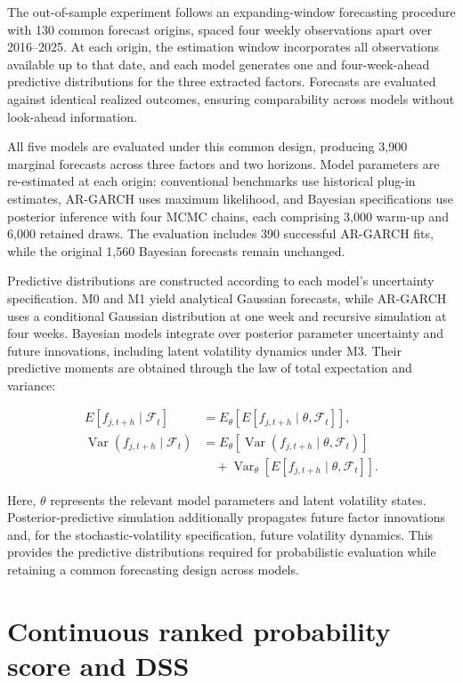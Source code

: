 \documentclass[
  12pt,
  letterpaper,
  DIV=11,
  numbers=noendperiod]{scrreprt}
\begin{document}
The out-of-sample experiment follows an expanding-window forecasting
procedure with 130 common forecast origins, spaced four weekly
observations apart over 2016--2025. At each origin, the estimation
window incorporates all observations available up to that date, and each
model generates one and four-week-ahead predictive distributions for the
three extracted factors. Forecasts are evaluated against identical
realized outcomes, ensuring comparability across models without
look-ahead information.

All five models are evaluated under this common design, producing 3,900
marginal forecasts across three factors and two horizons. Model
parameters are re-estimated at each origin: conventional benchmarks use
historical plug-in estimates, AR-GARCH uses maximum likelihood, and
Bayesian specifications use posterior inference with four MCMC chains,
each comprising 3,000 warm-up and 6,000 retained draws. The evaluation
includes 390 successful AR-GARCH fits, while the original 1,560 Bayesian
forecasts remain unchanged.

Predictive distributions are constructed according to each model's
uncertainty specification. M0 and M1 yield analytical Gaussian
forecasts, while AR-GARCH uses a conditional Gaussian distribution at
one week and recursive simulation at four weeks. Bayesian models
integrate over posterior parameter uncertainty and future innovations,
including latent volatility dynamics under M3. Their predictive moments
are obtained through the law of total expectation and variance:

\[
\begin{aligned}
E[f_{j,t+h}\mid\mathcal F_t]
&=E_\theta\!\left[
E[f_{j,t+h}\mid\theta,\mathcal F_t]
\right],\\
\operatorname{Var}(f_{j,t+h}\mid\mathcal F_t)
&=E_\theta\!\left[
\operatorname{Var}(f_{j,t+h}\mid\theta,\mathcal F_t)
\right]\\
&\quad+\operatorname{Var}_\theta\!\left[
E[f_{j,t+h}\mid\theta,\mathcal F_t]
\right].
\end{aligned}
\]

Here, \(\theta\) represents the relevant model parameters and latent
volatility states. Posterior-predictive simulation additionally
propagates future factor innovations and, for the stochastic-volatility
specification, future volatility dynamics. This provides the predictive
distributions required for probabilistic evaluation while retaining a
common forecasting design across models.

\section{Continuous ranked probability score and
DSS}\label{continuous-ranked-probability-score-and-dss}
\end{document}
